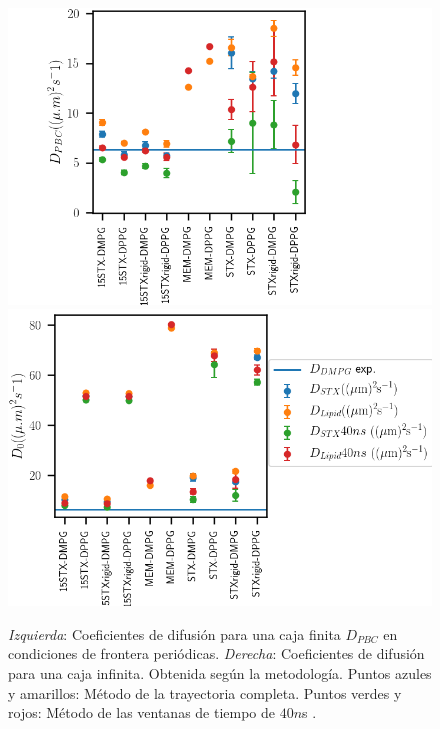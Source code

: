 \begin{figure}
\begin{center}
    \includegraphics[scale=0.33,trim={0 0 5cm 0},clip]{Plots/diff_pbc.png}
    \includegraphics[scale=0.33]{Plots/diff_inf.png}
  \caption{\textit{Izquierda}: Coeficientes de difusi\'{o}n para una caja finita $D_{PBC}$ en condiciones de frontera peri\'{o}dicas. \textit{Derecha}: Coeficientes de difusi\'{o}n para una caja infinita. Obtenida seg\'{u}n la metodolog\'{i}a. Puntos azules y amarillos: M\'{e}todo de la trayectoria completa. Puntos verdes y rojos: M\'{e}todo de las ventanas de tiempo de $40n$s .}
  \label{fig:dpbcinf}
\end{center}
\end{figure}

